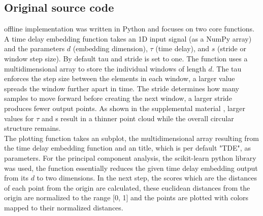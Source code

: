 \subsection{Original source code}
\label{section:OriginalImplementation}
\textcite{rakuschek2025visual} offline implementation was written in Python and focuses on two core functions. \\
A time delay embedding function takes an 1D input signal (as a NumPy array) and the parameters $d$ (embedding dimension), $\tau$ (time delay), and $s$ (stride or window step size). By default tau and stride is set to one. The function uses a multidimensional array to store the individual windows of length $d$. The tau enforces the step size between the elements in each window, a larger value spreads the window further apart in time.
The stride determines how many samples to move forward before creating the next window, a larger stride produces fewer output points.
As shown in the supplemental material \textcite{Supplemental_document}, larger values for $\tau$ and s result in a thinner point cloud while the overall circular structure remains. \\
The plotting function takes an subplot, the multidimensional array resulting from the time delay embedding function and an title, which is per default "TDE", as parameters.
For the principal component analysis, the scikit-learn python library was used, the function essentially reduces the given time delay embedding output from its $d$ to two dimensions. In the next step, the scores which are the distances of each point from the origin are calculated, these euclidean distances from the origin are normalized to the range [0, 1] and the points are plotted with colors mapped to their normalized distances.